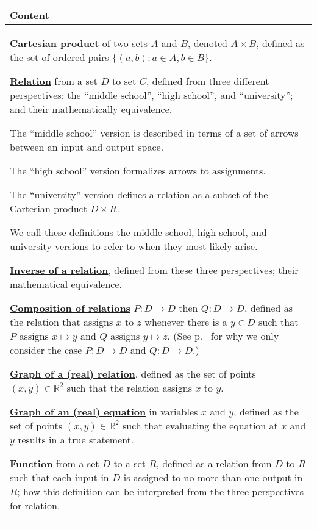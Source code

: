 \documentclass[11pt]{article}
\newcommand{\R}{\mathbb{R}}
\newcommand\st{:}
\renewcommand\emph[1]{\underline{\bf{#1}}} %
\theoremstyle{definition}
\begin{document}
\begin{tabular}{L{6.5in}} 
{\bf Content} \\ \hline \parskip4pt
\emph{Cartesian product} of two sets $A$ and $B$, denoted $A\times B$, defined as the set of ordered pairs $\{ (a,b) \st a\in A, b\in B \}$.

\emph{Relation} from a set $D$ to set $C$, defined from three different perspectives: the ``middle school'', ``high school'', and ``university''; and their mathematically equivalence. 
\begin{itemize*}
\item The ``middle school'' version is described in terms of a set of arrows between an input and output space.
\item The ``high school'' version formalizes arrows to assignments. 
\item The ``university'' version defines a relation as a subset of the Cartesian product $D\times R$. 
\end{itemize*}
We call these definitions the middle school, high school, and university versions to refer to when they most likely arise. 

\emph{Inverse of a relation}, defined from these three perspectives; their mathematical equivalence.

\emph{Composition of relations} $P:D\to D$ then $Q:D\to D$, defined 
as the relation that assigns $x$ to $z$ whenever there is a $y\in D$ such that $P$ assigns $x\mapsto y$ and $Q$ assigns $y\mapsto z$. (See p.~\pageref{s: composition} for why we only consider the case $P:D\to D$ and $Q:D\to D$.)

\emph{Graph of a (real) relation}, defined as the set of points $(x,y)\in \R^2$ such that the relation assigns $x$ to $y$.

\emph{Graph of an (real) equation} in variables $x$ and $y$, defined as the set of points $(x,y)\in \R^2$ such that evaluating the equation at $x$ and $y$ results in a true statement.

\emph{Function} from a set $D$ to a set $R$, defined as a relation from $D$ to $R$ such that each input in $D$ is assigned to no more than one output in $R$; how this definition can be interpreted from the three perspectives for relation.
\end{tabular} 
\end{document}
